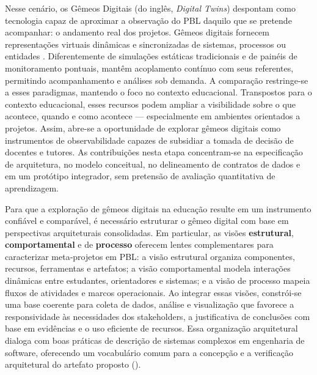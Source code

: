 \documentclass[12pt,a4paper]{article}
\begin{document}
Nesse cenário, os Gêmeos Digitais (do inglês, \textit{Digital Twins}) despontam como tecnologia capaz de aproximar a observação do PBL daquilo que se pretende acompanhar: o andamento real dos projetos. Gêmeos digitais fornecem representações virtuais dinâmicas e sincronizadas de sistemas, processos ou entidades \cite{grieves2014, tao2018, barricelli2019}. Diferentemente de simulações estáticas tradicionais e de painéis de monitoramento pontuais, mantêm acoplamento contínuo com seus referentes, permitindo acompanhamento e análises sob demanda. A comparação restringe-se a esses paradigmas, mantendo o foco no contexto educacional. Transpostos para o contexto educacional, esses recursos podem ampliar a visibilidade sobre o que acontece, quando e como acontece — especialmente em ambientes orientados a projetos. Assim, abre-se a oportunidade de explorar gêmeos digitais como instrumentos de observabilidade capazes de subsidiar a tomada de decisão de docentes e tutores. As contribuições nesta etapa concentram-se na especificação de arquitetura, no modelo conceitual, no delineamento de contratos de dados e em um protótipo integrador, sem pretensão de avaliação quantitativa de aprendizagem.

Para que a exploração de gêmeos digitais na educação resulte em um instrumento confiável e comparável, é necessário estruturar o gêmeo digital com base em perspectivas arquiteturais consolidadas. Em particular, as visões \textbf{estrutural}, \textbf{comportamental} e de \textbf{processo} oferecem lentes complementares para caracterizar meta‑projetos em PBL: a visão estrutural organiza componentes, recursos, ferramentas e artefatos; a visão comportamental modela interações dinâmicas entre estudantes, orientadores e sistemas; e a visão de processo mapeia fluxos de atividades e marcos operacionais. Ao integrar essas visões, constrói-se uma base coerente para coleta de dados, análise e visualização que favorece a responsividade às necessidades dos stakeholders, a justificativa de conclusões com base em evidências e o uso eficiente de recursos. Essa organização arquitetural dialoga com boas práticas de descrição de sistemas complexos em engenharia de software, oferecendo um vocabulário comum para a concepção e a verificação arquitetural do artefato proposto (\cite{iso42010}).
\end{document}
